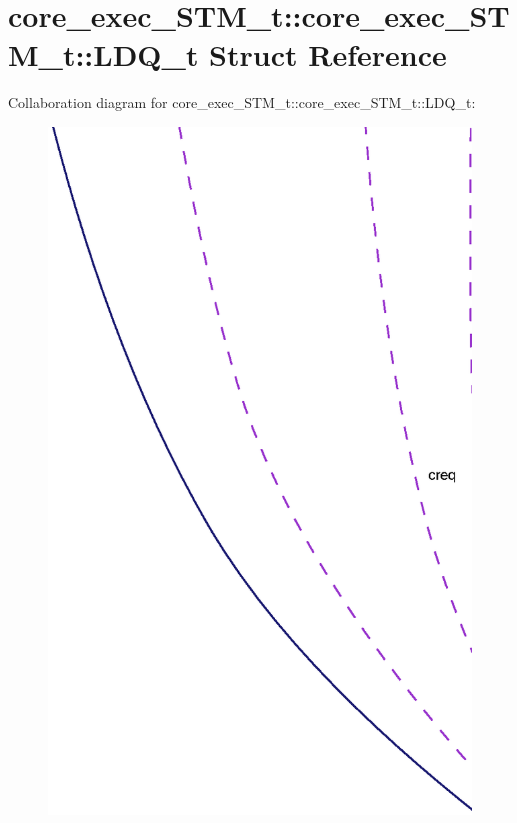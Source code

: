 \section{core\_\-exec\_\-STM\_\-t::core\_\-exec\_\-STM\_\-t::LDQ\_\-t Struct Reference}
\label{structcore__exec__STM__t_1_1LDQ__t}
Collaboration diagram for core\_\-exec\_\-STM\_\-t::core\_\-exec\_\-STM\_\-t::LDQ\_\-t:\nopagebreak
\begin{figure}[H]
\begin{center}
\leavevmode
\includegraphics[width=400pt]{structcore__exec__STM__t_1_1LDQ__t__coll__graph}
\end{center}
\end{figure}
